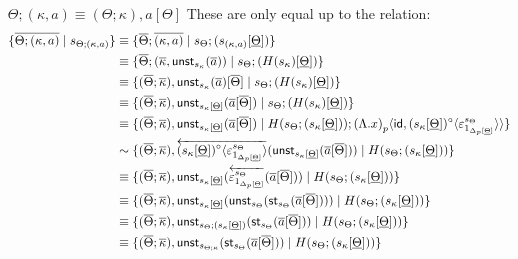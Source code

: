 \documentclass[10pt]{article}
\theoremstyle{definition}
\newcommand{\rewrite}[2]{\overleftarrow{#1}(#2)}
\newcommand\StI[2]{\ensuremath{\mathsf{st}_{#1}(#2)}}
\newcommand\UnSt[2]{\ensuremath{\mathsf{unst}_{#1}(#2)}}
\newcommand{\id}{\mathsf{id}}
\newcommand\ap[2]{\ensuremath{#1 \langle #2 \rangle }}
\begin{document}
\begin{enumerate}[style = multiline, labelwidth = 80pt]
\item[{$\Theta ; (\kappa , a) \equiv (\Theta ; \kappa) , a[\Theta]$}] These are only equal up to the relation: 
\begin{align*}
\{\upstairs{\Theta ; (\kappa , a) } \mid s_{\Theta ; (\kappa , a)}  \}
&\equiv \{\upstairs{\Theta} ; \upstairs{(\kappa , a)} \mid s_\Theta ; (s_{(\kappa , a)}[\downstairs{\Theta}])  \} \\
&\equiv \{ \upstairs{\Theta} ; (\upstairs{\kappa}, \UnSt{s_{\kappa}}{\upstairs{a}}) \mid s_\Theta ; (H(s_\kappa)[\downstairs{\Theta}])\} \\
&\equiv \{ (\upstairs{\Theta} ; \upstairs{\kappa}) , \UnSt{s_{\kappa}}{\upstairs{a}}[\upstairs{\Theta}] \mid s_\Theta ; (H(s_\kappa)[\downstairs{\Theta}]) \} \\
&\equiv \{ (\upstairs{\Theta} ; \upstairs{\kappa}) , \UnSt{s_{\kappa}[\downstairs{\Theta}]}{\upstairs{a}[\upstairs{\Theta}]} \mid s_\Theta ; (H(s_\kappa)[\downstairs{\Theta}]) \} \\
&\equiv \{ (\upstairs{\Theta} ; \upstairs{\kappa}) , \UnSt{s_{\kappa}[\downstairs{\Theta}]}{\upstairs{a}[\upstairs{\Theta}]} \mid H(s_\Theta ; (s_\kappa[\downstairs{\Theta}])) ; \ap{\asdep{(\Lambda.x)}}{\id, \ap{(s_\kappa[\downstairs{\Theta}])^\circ}{\varepsilon^{s_\Theta}_{1_{\asdep{\Delta}[\downstairs{\Theta}]}}}} \} \\
&\sim \{ (\upstairs{\Theta} ; \upstairs{\kappa}) , \rewrite{\ap{(s_\kappa[\downstairs{\Theta}])^\circ}{\varepsilon^{s_\Theta}_{1_{\asdep{\Delta}[\downstairs{\Theta}]}}}}{\UnSt{s_{\kappa}[\downstairs{\Theta}]}{\upstairs{a}[\upstairs{\Theta}]}}  \mid H(s_\Theta ; (s_\kappa[\downstairs{\Theta}])) \} \\
&\equiv \{ (\upstairs{\Theta} ; \upstairs{\kappa}) , \UnSt{s_{\kappa}[\downstairs{\Theta}]}{\rewrite{\varepsilon^{s_\Theta}_{1_{\asdep{\Delta}[\downstairs{\Theta}]}}}{\upstairs{a}[\upstairs{\Theta}]}}  \mid H(s_\Theta ; (s_\kappa[\downstairs{\Theta}])) \} \\
&\equiv \{ (\upstairs{\Theta} ; \upstairs{\kappa}) , \UnSt{s_{\kappa}[\downstairs{\Theta}]}{\UnSt{s_\Theta}{\StI{s_{\Theta}}{\upstairs{a}[\upstairs{\Theta}]}}}  \mid H(s_\Theta ; (s_\kappa[\downstairs{\Theta}])) \} \\
&\equiv \{(\upstairs{\Theta} ; \upstairs{\kappa}) , \UnSt{s_\Theta ; (s_{\kappa}[\downstairs{\Theta}])}{\StI{s_{\Theta}}{\upstairs{a}[\upstairs{\Theta}]}} \mid H(s_\Theta ; (s_\kappa[\downstairs{\Theta}])) \} \\
&\equiv \{ (\upstairs{\Theta} ; \upstairs{\kappa}) , \UnSt{s_{\Theta;\kappa}}{\StI{s_{\Theta}}{\upstairs{a}[\upstairs{\Theta}]}} \mid H(s_\Theta ; (s_\kappa[\downstairs{\Theta}]))\}\\

\end{align*}
\end{enumerate}
\end{document}
